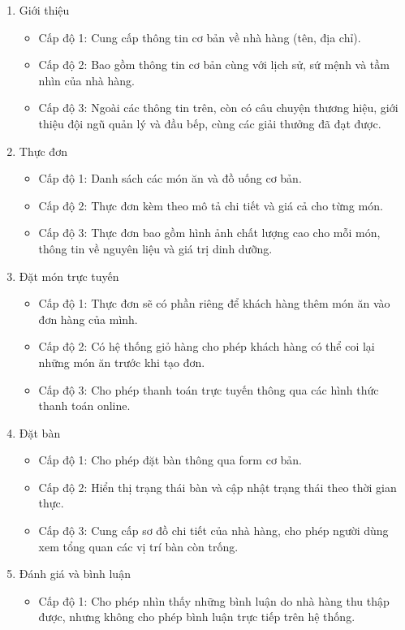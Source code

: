 \begin{enumerate}
	\item Giới thiệu
	      \begin{itemize}
		      \item Cấp độ 1: Cung cấp thông tin cơ bản về nhà hàng (tên, địa chỉ).
		      \item Cấp độ 2: Bao gồm thông tin cơ bản cùng với lịch sử, sứ mệnh và tầm nhìn của nhà hàng.
		      \item Cấp độ 3: Ngoài các thông tin trên, còn có câu chuyện thương hiệu, giới thiệu đội ngũ quản lý và đầu bếp, cùng các giải thưởng đã đạt được.
	      \end{itemize}
	\item Thực đơn
	      \begin{itemize}
		      \item Cấp độ 1: Danh sách các món ăn và đồ uống cơ bản.
		      \item Cấp độ 2: Thực đơn kèm theo mô tả chi tiết và giá cả cho từng món.
		      \item Cấp độ 3: Thực đơn bao gồm hình ảnh chất lượng cao cho mỗi món, thông tin về nguyên liệu và giá trị dinh dưỡng.
	      \end{itemize}
	\item Đặt món trực tuyến
	      \begin{itemize}
		      \item Cấp độ 1: Thực đơn sẽ có phần riêng để khách hàng thêm món ăn vào đơn hàng của mình.
		      \item Cấp độ 2: Có hệ thống giỏ hàng cho phép khách hàng có thể coi lại những món ăn trước khi tạo đơn.
		      \item Cấp độ 3: Cho phép thanh toán trực tuyến thông qua các hình thức thanh toán online.
	      \end{itemize}
	\item Đặt bàn
	      \begin{itemize}
		      \item Cấp độ 1: Cho phép đặt bàn thông qua form cơ bản.
		      \item Cấp độ 2: Hiển thị trạng thái bàn và cập nhật trạng thái theo thời gian thực.
		      \item Cấp độ 3: Cung cấp sơ đồ chi tiết của nhà hàng, cho phép người dùng xem tổng quan các vị trí bàn còn trống.
	      \end{itemize}
	\item Đánh giá và bình luận
	      \begin{itemize}
		      \item Cấp độ 1: Cho phép nhìn thấy những bình luận do nhà hàng thu thập được, nhưng không cho phép bình luận trực tiếp trên hệ thống.

\end{itemize}
\end{enumerate}

